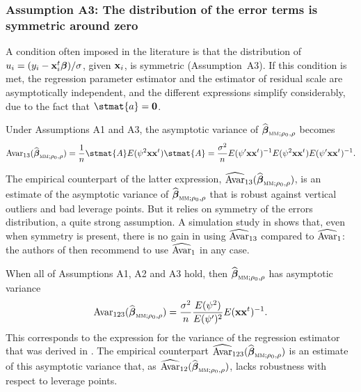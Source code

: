 \subsubsection{Assumption A3: The distribution of the error terms is symmetric around zero}

A condition often imposed in the literature is that the distribution of $u_i =
(y_i-\mathbf x_i^t\boldsymbol\beta)/\sigma$, given $\mathbf x_i$, is symmetric
(Assumption~A3). If this condition is met, the regression parameter estimator
and the estimator of residual scale are asymptotically independent, and the
different expressions simplify considerably, due to the fact that $\stmat{a} =
\stvec{0}$.

Under Assumptions A1 and A3, the asymptotic variance of 
$\sthat{\boldsymbol\beta}_{\stsc{MM};\rho_0,\rho}$ becomes
\[
    \mathrm{Avar}_{13}(\sthat{\boldsymbol\beta}_{\stsc{MM};\rho_0,\rho})
    = \frac{1}{n} \stmat{A} E(\psi^2\stvec{x}\stvec{x}^t) \stmat{A}
    = \frac{\sigma^2}{n} E(\psi'\stvec{x}\stvec{x}^t)^{-1}
        E(\psi^2\stvec{x}\stvec{x}^t)
        E(\psi'\stvec{x}\stvec{x}^t)^{-1}.
\]

The empirical counterpart of the latter expression,
$\sthat{\mathrm{Avar}}_{13}(\sthat{\boldsymbol\beta}_{\stsc{MM};\rho_0,\rho})$,
is an estimate of the asymptotic variance of
$\sthat{\boldsymbol\beta}_{\stsc{MM};\rho_0,\rho}$ that is robust against
vertical outliers and bad leverage points. But it relies on symmetry of the
errors distribution, a quite strong assumption. A simulation study in
\cite{Croux:2003} shows that, even when symmetry is present, there is no gain
in using $\widehat{\mathrm{Avar}}_{13}$ compared to $\widehat{\mathrm{Avar}}_1$:
the authors of \cite{Croux:2003} then recommend to use
$\widehat{\mathrm{Avar}}_1$ in any case.

When all of Assumptions A1, A2 and A3 hold, then 
$\sthat{\boldsymbol\beta}_{\stsc{MM};\rho_0,\rho}$ has asymptotic variance
\[
    \mathrm{Avar}_{123}(\sthat{\boldsymbol\beta}_{\stsc{MM};\rho_0,\rho})
    = \frac{\sigma^2}{n} \frac{E(\psi^2)}{E(\psi')^2}
      E(\stvec{x}\stvec{x}^t)^{-1}.
\]
This corresponds to the expression for the variance of the  regression
estimator that was derived in \cite{yohai:1987}. The empirical counterpart
$\sthat{\mathrm{Avar}}_{123}(\sthat{\boldsymbol\beta}_{\stsc{MM};\rho_0,\rho})$
is an estimate of this asymptotic variance that, as
$\sthat{\mathrm{Avar}}_{12}(\sthat{\boldsymbol\beta}_{\stsc{MM};\rho_0,\rho})$,
lacks robustness with respect to leverage points.

